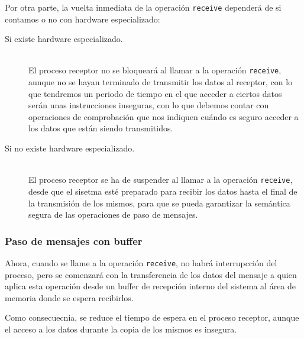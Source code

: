 Por otra parte, la vuelta inmediata de la operación \verb|receive| dependerá de si contamos o no con hardware especializado:
\begin{description}
    \item [Si existe hardware especializado.]~\\
        El proceso receptor no se bloqueará al llamar a la operación \verb|receive|, aunque no se hayan terminado de transmitir los datos al receptor, con lo que tendremos un periodo de tiempo en el que acceder a ciertos datos serán unas instrucciones inseguras, con lo que debemos contar con operaciones de comprobación que nos indiquen cuándo es seguro acceder a los datos que están siendo transmitidos.
    \item [Si no existe hardware especializado.]~\\
        El proceso receptor se ha de suspender al llamar a la operación \verb|receive|, desde que el sisetma esté preparado para recibir los datos hasta el final de la transmisión de los mismos, para que se pueda garantizar la semántica segura de las operaciones de paso de mensajes.
\end{description}

\subsubsection{Paso de mensajes con buffer}
Ahora, cuando se llame a la operación \verb|receive|, no habrá interrupcción del proceso, pero se comenzará con la transferencia de los datos del mensaje a quien aplica esta operación desde un buffer de recepción interno del sistema al área de memoria donde se espera recibirlos.

Como consecuecnia, se reduce el tiempo de espera en el proceso receptor, aunque el acceso a los datos durante la copia de los mismos es insegura.
